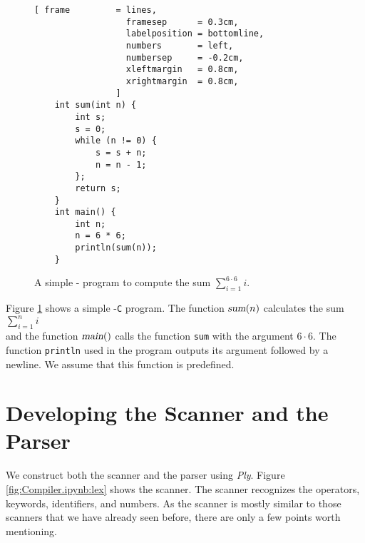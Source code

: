 \begin{figure}[!ht]
\centering
\begin{Verbatim}[ frame         = lines, 
                  framesep      = 0.3cm, 
                  labelposition = bottomline,
                  numbers       = left,
                  numbersep     = -0.2cm,
                  xleftmargin   = 0.8cm,
                  xrightmargin  = 0.8cm,
                ]
    int sum(int n) {
        int s;
        s = 0;
        while (n != 0) {
            s = s + n;
            n = n - 1;    
        };
        return s;
    }  
    int main() {
        int n;
        n = 6 * 6;
        println(sum(n));
    }
\end{Verbatim}
\vspace*{-0.3cm}
\caption{A simple - program to compute the sum
  $\displaystyle \sum\limits_{i=1}^{6 \cdot 6} i$.}
\label{fig:sum.c}
\end{figure}

\noindent
Figure \ref{fig:sum.c} shows a simple -\texttt{C} program. The function $\textsl{sum}(n)$
calculates the sum 
\\[0.2cm]
\hspace*{1.3cm}
$\displaystyle\sum\limits_{i=1}^n i$
\\[0.2cm]
 and the function $\textsl{main}()$ calls the function \texttt{sum}
with the argument $6 \cdot 6$. The function \texttt{println} used in the program outputs its argument followed
by a newline. We assume that this function is predefined. 

\section{Developing the  Scanner and the Parser}
We construct both the scanner and the parser using  \textsl{Ply}.
Figure \ref{fig:Compiler.ipynb:lex} shows the scanner.  The scanner
recognizes the operators, keywords, identifiers, and numbers.  As the scanner is mostly similar to those
scanners that we have already seen before, there are only a few points worth mentioning.

